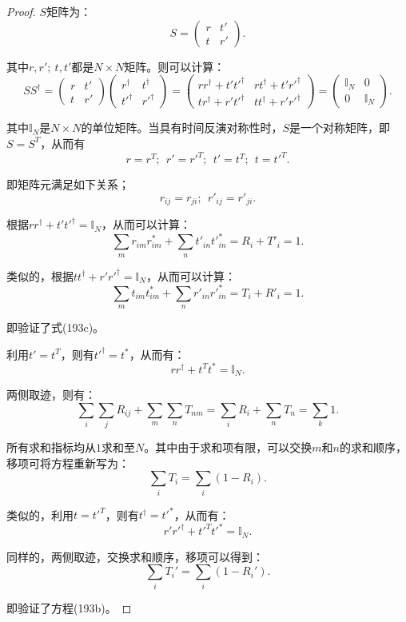 \documentclass[reqno,a4paper,12pt]{amsart}
\begin{document}
\begin{proof}
$S$矩阵为：
\[
	S = \left( \begin{matrix}
		r & t' \\
		t & r'
	\end{matrix} \right).
\]

其中$r, r'; \ t, t'$都是$N\times N$矩阵。则可以计算：
\[
	SS^\dagger = \left( \begin{matrix}
		r & t' \\
		t & r'
	\end{matrix} \right) \left( \begin{matrix}
		r^\dagger & t^\dagger \\
		t'^\dagger & r'^\dagger
	\end{matrix} \right) = \left( \begin{matrix}
		r r^\dagger + t't'^\dagger & rt^\dagger + t'r'^\dagger \\
		tr^\dagger + r't'^\dagger & tt^\dagger + r'r'^\dagger
	\end{matrix} \right) = \left( \begin{matrix}
		\mathbb{I}_N & 0 \\
		0 & \mathbb{I}_N
	\end{matrix} \right).
\]

其中$\mathbb{I}_N$是$N\times N$的单位矩阵。当具有时间反演对称性时，$S$是一个对称矩阵，即$S = S^T$，从而有
\[
	r = r^T; \ \ r' = r'^T; \ \ t' = t^T; \ \ t = t'^T.
\]

即矩阵元满足如下关系；
\[
	r_{ij} = r_{ji}; \ \ r'_{ij} = r'_{ji}.
\]

根据$rr^\dagger + t't'^\dagger = \mathbb{I}_N$，从而可以计算：
\[
	\sum_m r_{im}r_{im}^* + \sum_n {t'}_{in}{t'}_{in}^* = R_i + T'_i = 1.
\]

类似的，根据$tt^\dagger + r'r'^\dagger = \mathbb{I}_N$，从而可以计算：
\[
	\sum_m t_{im}t_{im}^* + \sum_n {r'}_{in}{r'}_{in}^* = T_i + R'_i = 1.
\]

即验证了式(193c)。

利用$t' = t^T$，则有$t'^\dagger = t^*$，从而有：
\[
	r r^\dagger + t^Tt^* = \mathbb{I}_N.
\]

两侧取迹，则有：
\[
	\sum_i \sum_j R_{ij} + \sum_m \sum_n T_{nm} = \sum_i R_i + \sum_n T_n = \sum_k 1. 
\]

所有求和指标均从$1$求和至$N$。其中由于求和项有限，可以交换$m$和$n$的求和顺序，移项可将方程重新写为：
\[
	\sum_i T_i = \sum_i (1-R_i).
\]

类似的，利用$t = t'^T$，则有$t^\dagger = t'^*$，从而有：
\[
	r' r'^\dagger + t'^Tt'^* = \mathbb{I}_N.
\]

同样的，两侧取迹，交换求和顺序，移项可以得到：
\[
	\sum_i T_i' = \sum_i (1-R_i').
\]

即验证了方程(193b)。
\end{proof}
\end{document}
